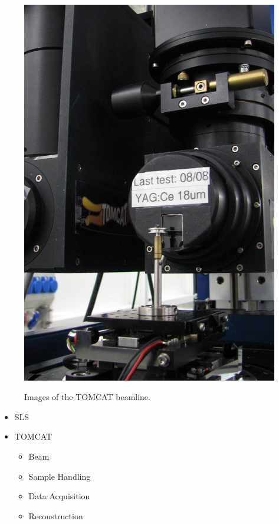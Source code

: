 \begin{figure}[htb]
{		\includegraphics[width=\imsize]{img/TOMCAT2}%
		\label{subfig:TOMCAT2}%
		}%
	\caption{Images of the \ac{TOMCAT} beamline.}
\end{figure}

\begin{itemize}
    \item SLS
    \item TOMCAT
    \begin{itemize}
        \item Beam
        \item Sample Handling
        \item Data Acquisition
        \item Reconstruction
    \end{itemize}
\end{itemize}